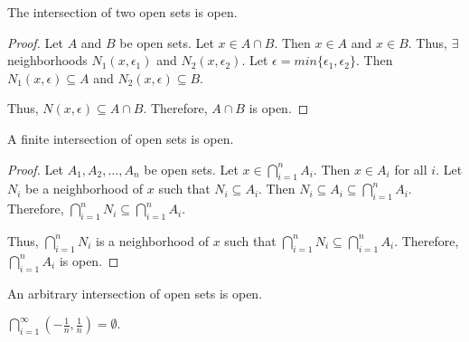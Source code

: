 \begin{theorem}
    The intersection of two open sets is open.
\end{theorem}
\begin{proof}
    Let $A$ and $B$ be open sets. Let $x \in A \cap B$. Then $x \in A$ and $x \in B$. Thus, $\exists$ neighborhoods $N_1(x, \epsilon_1)$ and $N_2(x, \epsilon_2)$. Let $\epsilon = min\{\epsilon_1, \epsilon_2\}$. Then $N_1(x, \epsilon) \subseteq A$ and $N_2(x, \epsilon) \subseteq B$. 
    
    Thus, $N(x, \epsilon) \subseteq A \cap B$. Therefore, $A \cap B$ is open.
\end{proof}

\begin{theorem}
    A finite intersection of open sets is open.
\end{theorem}
\begin{proof}
    Let $A_1, A_2, \ldots, A_n$ be open sets. Let $x \in \bigcap_{i=1}^n A_i$. Then $x \in A_i$ for all $i$. Let $N_i$ be a neighborhood of $x$ such that $N_i \subseteq A_i$. Then $N_i \subseteq A_i \subseteq \bigcap_{i=1}^n A_i$. Therefore, $\bigcap_{i=1}^n N_i \subseteq \bigcap_{i=1}^n A_i$. 
    
    Thus, $\bigcap_{i=1}^n N_i$ is a neighborhood of $x$ such that $\bigcap_{i=1}^n N_i \subseteq \bigcap_{i=1}^n A_i$. Therefore, $\bigcap_{i=1}^n A_i$ is open.
\end{proof}

\begin{theorem}
    An arbitrary intersection of open sets is open.
\end{theorem}
\begin{remark}[Counterexample]
    $\bigcap_{i=1}^\infty (-\frac{1}{n}, \frac{1}{n}) = \emptyset$.
\end{remark}